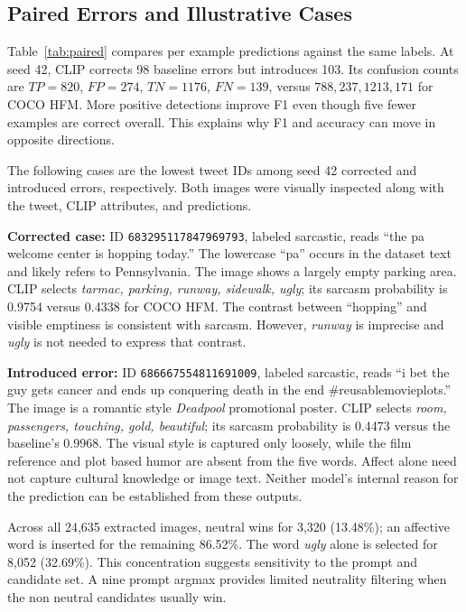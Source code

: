 \documentclass[conference]{IEEEtran}
\begin{document}
\subsection{Paired Errors and Illustrative Cases}
Table~\ref{tab:paired} compares per example predictions against the same labels. At seed 42, CLIP corrects 98 baseline errors but introduces 103. Its confusion counts are $TP=820$, $FP=274$, $TN=1176$, $FN=139$, versus $788,237,1213,171$ for COCO HFM. More positive detections improve F1 even though five fewer examples are correct overall. This explains why F1 and accuracy can move in opposite directions.

\begin{table}[t]
\caption{CLIP HFM versus COCO HFM on identical test IDs. Corrected: baseline wrong, CLIP right; introduced: baseline right, CLIP wrong.}
\label{tab:paired}
\centering\small

\end{table}

The following cases are the lowest tweet IDs among seed 42 corrected and introduced errors, respectively. Both images were visually inspected along with the tweet, CLIP attributes, and predictions.

\noindent\textbf{Corrected case:} ID \texttt{683295117847969793}, labeled sarcastic, reads ``the pa welcome center is hopping today.'' The lowercase ``pa'' occurs in the dataset text and likely refers to Pennsylvania. The image shows a largely empty parking area. CLIP selects \emph{tarmac, parking, runway, sidewalk, ugly}; its sarcasm probability is 0.9754 versus 0.4338 for COCO HFM. The contrast between ``hopping'' and visible emptiness is consistent with sarcasm. However, \emph{runway} is imprecise and \emph{ugly} is not needed to express that contrast.

\noindent\textbf{Introduced error:} ID \texttt{686667554811691009}, labeled sarcastic, reads ``i bet the guy gets cancer and ends up conquering death in the end \#reusablemovieplots.'' The image is a romantic style \emph{Deadpool} promotional poster. CLIP selects \emph{room, passengers, touching, gold, beautiful}; its sarcasm probability is 0.4473 versus the baseline's 0.9968. The visual style is captured only loosely, while the film reference and plot based humor are absent from the five words. Affect alone need not capture cultural knowledge or image text. Neither model's internal reason for the prediction can be established from these outputs.

Across all 24,635 extracted images, neutral wins for 3,320 (13.48\%); an affective word is inserted for the remaining 86.52\%. The word \emph{ugly} alone is selected for 8,052 (32.69\%). This concentration suggests sensitivity to the prompt and candidate set. A nine prompt argmax provides limited neutrality filtering when the non neutral candidates usually win.
\end{document}
